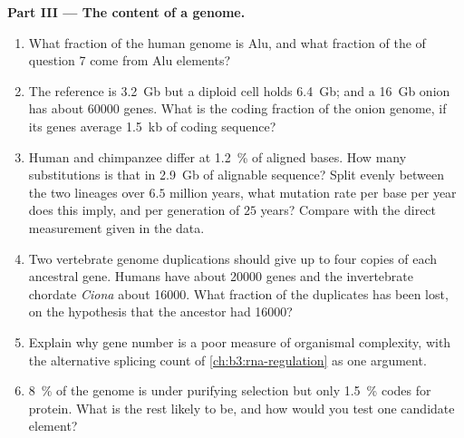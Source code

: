 \begin{problem}
\medskip
\noindent\textbf{Part III --- The content of a genome.}
\begin{enumerate}[resume]
  \item What fraction of the human genome is Alu, and what fraction of
        the  of question 7 come from Alu elements?
  \item The reference is \qty{3.2}{Gb} but a diploid cell holds
        \qty{6.4}{Gb}; and a \qty{16}{Gb} onion has about \num{60000}
        genes. What is the coding fraction of the onion genome, if its
        genes average \qty{1.5}{kb} of coding sequence?
  \item Human and chimpanzee differ at \qty{1.2}{\%} of aligned bases.
        How many substitutions is that in \qty{2.9}{Gb} of alignable
        sequence? Split evenly between the two lineages over $6.5$
        million years, what mutation rate per base per year does this
        imply, and per generation of $25$ years? Compare with the
        direct measurement given in the data.
  \item Two vertebrate genome duplications should give up to four
        copies of each ancestral gene. Humans have about \num{20000}
        genes and the invertebrate chordate \emph{Ciona} about
        \num{16000}. What fraction of the duplicates has been lost, on
        the hypothesis that the ancestor had \num{16000}?
  \item Explain why gene number is a poor measure of organismal
        complexity, with the alternative splicing count of
        \cref{ch:b3:rna-regulation} as one argument.
  \item \qty{8}{\%} of the genome is under purifying selection but only
        \qty{1.5}{\%} codes for protein. What is the rest likely to
        be, and how would you test one candidate element?
\end{enumerate}


\end{problem}
